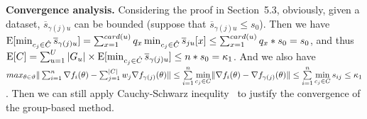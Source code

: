 \noindent \textbf{Convergence analysis.}  
Considering the proof in Section~5.3, 
obviously, given a dataset, $\overline{s}_{\gamma(j)u}$ can be bounded (suppose that $\overline{s}_{\gamma(j)u} \leq s_{0}$). Then we have
$\mathrm{E}[\min_{c_j\in \hat{C}}\overline{s}_{\gamma(j)u}] = \sum_{x=1}^{card(u)} q_x \min_{c_j \in \hat{C}} \overline{s}_{ju}[x] \leq \sum_{x= 1}^{card(u)} q_x * s_{0} = s_{0}$, and thus  $\mathrm{E}[C] = \sum_{u=1}^U  |G_u| \times\mathrm{E}[\min_{c_j\in \hat{C}}\overline{s}_{\gamma(j)u}] \leq n * s_{0} = \kappa_1$. And we also have $max_{\theta \in \vartheta} \Vert \sum_{i=1}^{n} \nabla f_{i}(\theta) - \sum_{j=1}^{\vert C \vert} w_j \nabla f_{\gamma(j)}(\theta) \Vert \leq \sum\limits_{i=1}^n \min \limits_{c_j\in C}\lVert \nabla f_i(\theta) - \nabla f_{\gamma(j)}(\theta) \rVert \leq \sum\limits_{i=1}^n \min \limits_{c_j\in C} s_{ij}  \leq \kappa_1$.
Then we can still apply Cauchy-Schwarz inequlity~\cite{strang2006linear} to justify the convergence of the group-based method.
 
 
 

